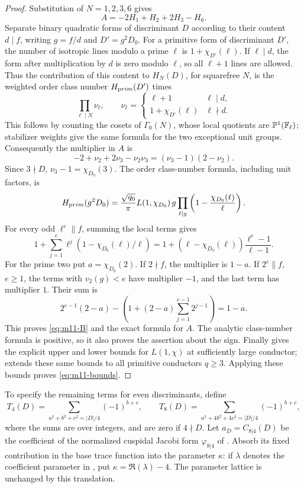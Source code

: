 \begin{proof}
Substitution of \(N=1,2,3,6\) gives
\[
 A=-2H_1+H_2+2H_3-H_6.
\]
Separate binary quadratic forms of discriminant \(D\) according to
their content \(d\mid f\), writing \(g=f/d\) and \(D'=g^2D_0\).
For a primitive form of discriminant \(D'\), the number of isotropic
lines modulo a prime \(\ell\) is \(1+\chi_{D'}(\ell)\).
If \(\ell\mid d\), the form after multiplication by \(d\) is zero
modulo \(\ell\), so all \(\ell+1\) lines are allowed.
Thus the contribution of this content to \(H_N(D)\), for squarefree
\(N\), is the weighted order class number \(H_{\mathrm prim}(D')\)
times
\[
 \prod_{\ell\mid N}\nu_\ell,\qquad
 \nu_\ell=
 \begin{cases}\ell+1&\ell\mid d,\\
 1+\chi_{D'}(\ell)&\ell\nmid d.
 \end{cases}
\]
This follows by counting the cosets of \(\Gamma_0(N)\), whose
local quotients are \(\mathbb P^1(\mathbb F_\ell)\); stabilizer weights
give the same formula for the two exceptional unit groups.
Consequently the multiplier in \(A\) is
\[
 -2+\nu_2+2\nu_3-\nu_2\nu_3=(\nu_3-1)(2-\nu_2).
\]
Since \(3\nmid D\), \(\nu_3-1=\chi_{D_0}(3)\).
The order class-number formula, including unit factors, is
\[
 H_{\mathrm prim}(g^2D_0)=
 \frac{\sqrt{q_0}}{\pi}L(1,\chi_{D_0})\,
 g\prod_{\ell\mid g}\left(1-\frac{\chi_{D_0}(\ell)}{\ell}\right).
\]
For every odd \(\ell^e\parallel f\), summing the local terms gives
\[
 1+\sum_{j=1}^e\ell^j(1-\chi_{D_0}(\ell)/\ell)
 =1+(\ell-\chi_{D_0}(\ell))\frac{\ell^e-1}{\ell-1}.
\]
For the prime two put \(a=\chi_{D_0}(2)\).
If \(2\nmid f\), the multiplier is \(1-a\).
If \(2^e\parallel f\), \(e\ge1\), the terms with
\(v_2(g)<e\) have multiplier \(-1\), and the last term has
multiplier \(1\). Their sum is
\[
 2^{e-1}(2-a)-
 \left(1+(2-a)\sum_{j=1}^{e-1}2^{j-1}\right)=1-a.
\]
This proves \eqref{eq:m11-B} and the exact formula for \(A\).
The analytic class-number formula is positive, so it also proves
the assertion about the sign. Finally
\cite[Theorem~1.5]{LLS2015} gives the explicit upper and lower
bounds for \(L(1,\chi)\) at sufficiently large conductor;
\cite[Theorem~1]{LT2022} extends these same bounds to all
primitive conductors \(q\ge3\). Applying these bounds proves
\eqref{eq:m11-bounds}.
\end{proof}

To specify the remaining terms for even discriminants, define
\[
 T_4(D)=\sum_{a^2+b^2+c^2=|D|/4}(-1)^{b+c},\qquad
 T_8(D)=\sum_{a^2+4b^2+4c^2=|D|/4}(-1)^{b+c},
\]
where the sums are over integers, and are zero if \(4\nmid D\).
Let \(a_D=C_{8|4}(D)\) be the coefficient of the normalized
cuspidal Jacobi form \(\varphi_{8|4}\) of
\cite[equation~(4.2.9)]{CDM2025}.
Absorb its fixed contribution in the base trace function into the
parameter \(\kappa\): if \(\lambda\) denotes the coefficient
parameter in \cite[equation~(4.3.1)]{CDM2025}, put
\(\kappa=\Re(\lambda)-4\).
The parameter lattice is unchanged by this translation.

